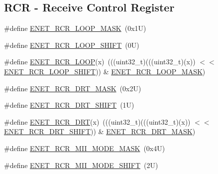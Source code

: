 \subsection*{R\+CR -\/ Receive Control Register}
\begin{DoxyCompactItemize}
\item 
\#define \mbox{\hyperlink{group___e_n_e_t___register___masks_ga0d93b88f79d8bdd51bb415a1ff84dd65}{E\+N\+E\+T\+\_\+\+R\+C\+R\+\_\+\+L\+O\+O\+P\+\_\+\+M\+A\+SK}}~(0x1\+U)
\item 
\#define \mbox{\hyperlink{group___e_n_e_t___register___masks_ga282373d2872e9226759336d35bb56c0a}{E\+N\+E\+T\+\_\+\+R\+C\+R\+\_\+\+L\+O\+O\+P\+\_\+\+S\+H\+I\+FT}}~(0\+U)
\item 
\#define \mbox{\hyperlink{group___e_n_e_t___register___masks_gaa5e39e536360104bc0811586ec459c26}{E\+N\+E\+T\+\_\+\+R\+C\+R\+\_\+\+L\+O\+OP}}(x)~(((uint32\+\_\+t)(((uint32\+\_\+t)(x)) $<$$<$ \mbox{\hyperlink{group___e_n_e_t___register___masks_ga282373d2872e9226759336d35bb56c0a}{E\+N\+E\+T\+\_\+\+R\+C\+R\+\_\+\+L\+O\+O\+P\+\_\+\+S\+H\+I\+FT}})) \& \mbox{\hyperlink{group___e_n_e_t___register___masks_ga0d93b88f79d8bdd51bb415a1ff84dd65}{E\+N\+E\+T\+\_\+\+R\+C\+R\+\_\+\+L\+O\+O\+P\+\_\+\+M\+A\+SK}})
\item 
\#define \mbox{\hyperlink{group___e_n_e_t___register___masks_ga58442922cdcafe3b6d538552b38f4899}{E\+N\+E\+T\+\_\+\+R\+C\+R\+\_\+\+D\+R\+T\+\_\+\+M\+A\+SK}}~(0x2\+U)
\item 
\#define \mbox{\hyperlink{group___e_n_e_t___register___masks_ga6fd2d01580d2b9cbe640d0af201ea723}{E\+N\+E\+T\+\_\+\+R\+C\+R\+\_\+\+D\+R\+T\+\_\+\+S\+H\+I\+FT}}~(1\+U)
\item 
\#define \mbox{\hyperlink{group___e_n_e_t___register___masks_gab66299cbed040bf91fe1a0fb12728501}{E\+N\+E\+T\+\_\+\+R\+C\+R\+\_\+\+D\+RT}}(x)~(((uint32\+\_\+t)(((uint32\+\_\+t)(x)) $<$$<$ \mbox{\hyperlink{group___e_n_e_t___register___masks_ga6fd2d01580d2b9cbe640d0af201ea723}{E\+N\+E\+T\+\_\+\+R\+C\+R\+\_\+\+D\+R\+T\+\_\+\+S\+H\+I\+FT}})) \& \mbox{\hyperlink{group___e_n_e_t___register___masks_ga58442922cdcafe3b6d538552b38f4899}{E\+N\+E\+T\+\_\+\+R\+C\+R\+\_\+\+D\+R\+T\+\_\+\+M\+A\+SK}})
\item 
\#define \mbox{\hyperlink{group___e_n_e_t___register___masks_ga117cf78ff620b783e4dc4156ad1a735b}{E\+N\+E\+T\+\_\+\+R\+C\+R\+\_\+\+M\+I\+I\+\_\+\+M\+O\+D\+E\+\_\+\+M\+A\+SK}}~(0x4\+U)
\item 
\#define \mbox{\hyperlink{group___e_n_e_t___register___masks_gaef1228d5d365350c81bf4bf641ad3dd4}{E\+N\+E\+T\+\_\+\+R\+C\+R\+\_\+\+M\+I\+I\+\_\+\+M\+O\+D\+E\+\_\+\+S\+H\+I\+FT}}~(2\+U)

\end{DoxyCompactItemize}
